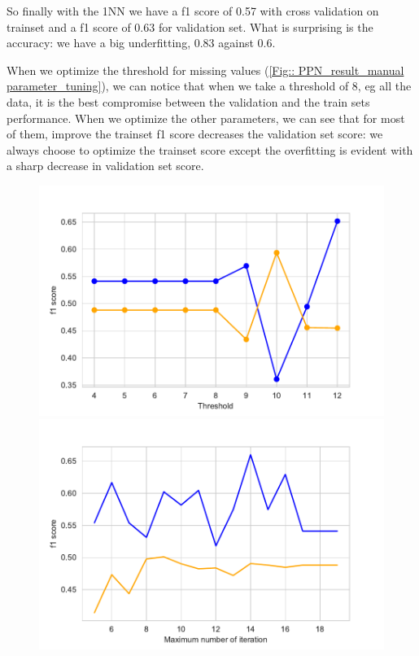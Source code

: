 \documentclass[11pt]{article}
\begin{document}
So finally with the 1NN we have a f1 score of 0.57 with cross validation on trainset and a f1 score of 0.63 for validation set. What is surprising is the accuracy: we have a big underfitting, 0.83 against 0.6.

When we optimize the threshold for missing values (\ref{Fig:: PPN_result_manual parameter_tuning}), we can notice that when we take a threshold of 8, eg all the data, it is the best compromise between the validation and the train sets performance. When we optimize the other parameters, we can see that for most of them, improve the trainset f1 score decreases the validation set score: we always choose to optimize the trainset score except the overfitting is evident with a sharp decrease in validation set score.

\begin{figure}[h]
\begin{minipage}[l]{0.33\textwidth}
\includegraphics[width=1\linewidth]{bridges/thresholds_ppn.pdf}
\end{minipage}
\begin{minipage}[l]{0.33\textwidth}
\includegraphics[width=1\linewidth]{bridges/max_iter_ppn.pdf}

\end{minipage}
\end{figure}
\end{document}
